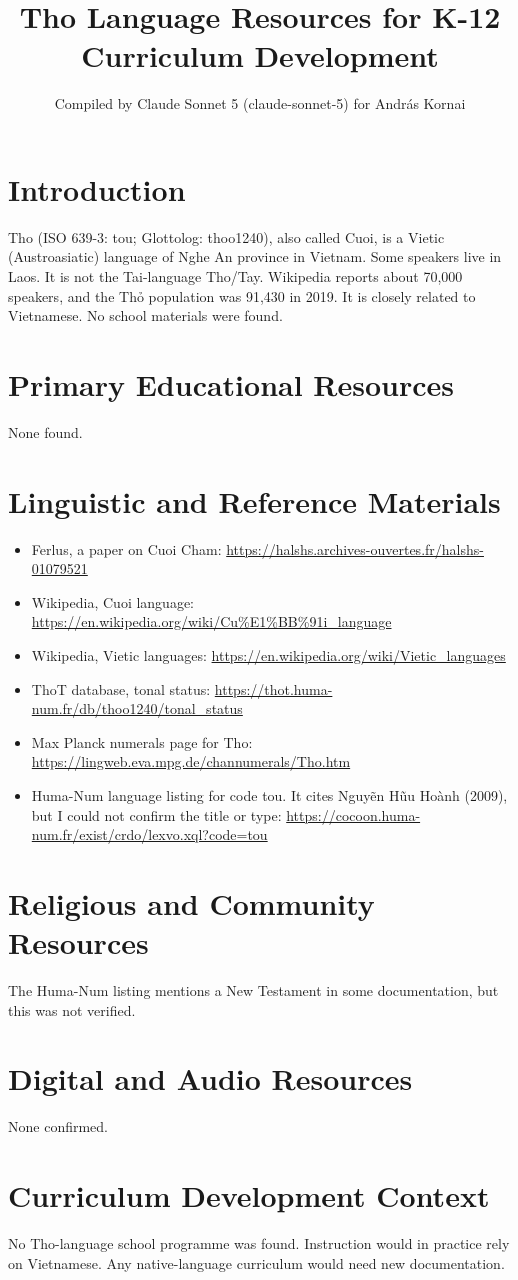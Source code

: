 \documentclass[12pt]{article}
\title{Tho Language Resources for K-12 Curriculum Development}
\author{Compiled by Claude Sonnet 5 (claude-sonnet-5) for Andr\'as Kornai}
\date{}
\begin{document}
\maketitle

\section{Introduction}
Tho (ISO 639-3: tou; Glottolog: thoo1240), also called Cuoi, is a Vietic (Austroasiatic) language of Nghe An province in Vietnam. Some speakers live in Laos. It is not the Tai-language Tho/Tay. Wikipedia reports about 70,000 speakers, and the Th\h{o} population was 91,430 in 2019. It is closely related to Vietnamese. No school materials were found.

\section{Primary Educational Resources}
None found.

\section{Linguistic and Reference Materials}
\begin{itemize}
\item Ferlus, a paper on Cuoi Cham: \url{https://halshs.archives-ouvertes.fr/halshs-01079521}
\item Wikipedia, Cuoi language: \url{https://en.wikipedia.org/wiki/Cu%E1%BB%91i_language}
\item Wikipedia, Vietic languages: \url{https://en.wikipedia.org/wiki/Vietic_languages}
\item ThoT database, tonal status: \url{https://thot.huma-num.fr/db/thoo1240/tonal_status}
\item Max Planck numerals page for Tho: \url{https://lingweb.eva.mpg.de/channumerals/Tho.htm}
\item Huma-Num language listing for code tou. It cites Nguy\~en H\~uu Ho\`anh (2009), but I could not confirm the title or type: \url{https://cocoon.huma-num.fr/exist/crdo/lexvo.xql?code=tou}
\end{itemize}

\section{Religious and Community Resources}
The Huma-Num listing mentions a New Testament in some documentation, but this was not verified.

\section{Digital and Audio Resources}
None confirmed.

\section{Curriculum Development Context}
No Tho-language school programme was found. Instruction would in practice rely on Vietnamese. Any native-language curriculum would need new documentation.
\end{document}
